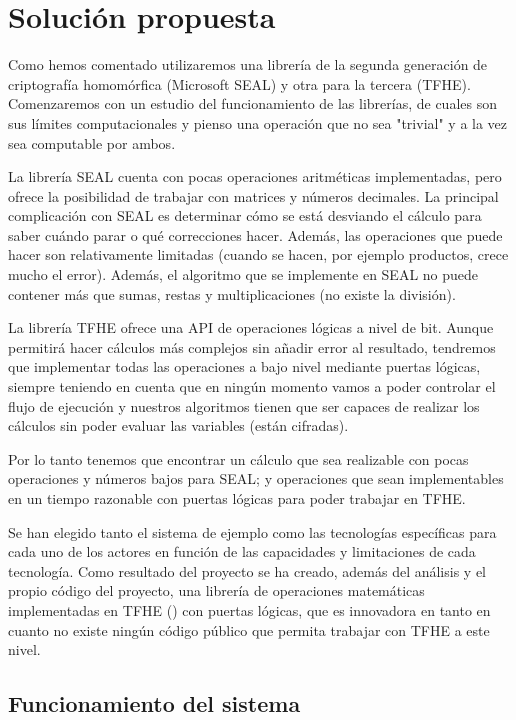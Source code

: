 \chapter{Solución propuesta}
\label{chap:poc}

Como hemos comentado utilizaremos una librería de la segunda generación de criptografía homomórfica (Microsoft SEAL) y otra para la tercera (TFHE). Comenzaremos con un estudio del funcionamiento de las librerías, de cuales son sus límites computacionales y pienso una operación que no sea "trivial" y a la vez sea computable por ambos.

La librería SEAL cuenta con pocas operaciones aritméticas implementadas, pero ofrece la posibilidad de trabajar con matrices y números decimales. La principal complicación con SEAL es determinar cómo se está desviando el cálculo para saber cuándo parar o qué correcciones hacer. Además, las operaciones que puede hacer son relativamente limitadas (cuando se hacen, por ejemplo productos, crece mucho el error). Además, el algoritmo que se implemente en SEAL no puede contener más que sumas, restas y multiplicaciones (no existe la división).

La librería TFHE ofrece una API de operaciones lógicas a nivel de bit. Aunque permitirá hacer cálculos más complejos sin añadir error al resultado, tendremos que implementar todas las operaciones a bajo nivel mediante puertas lógicas, siempre teniendo en cuenta que en ningún momento vamos a poder controlar el flujo de ejecución y nuestros algoritmos tienen que ser capaces de realizar los cálculos sin poder evaluar las variables (están cifradas).

Por lo tanto tenemos que encontrar un cálculo que sea realizable con pocas operaciones y números bajos para SEAL; y operaciones que sean implementables en un tiempo razonable con puertas lógicas para poder trabajar en TFHE.

Se han elegido tanto el sistema de ejemplo como las tecnologías específicas para cada uno de los actores en función de las capacidades y limitaciones de cada tecnología. Como resultado del proyecto se ha creado, además del análisis y el propio código del proyecto, una librería de operaciones matemáticas implementadas en TFHE (\cite{junquera_tfhe_2019}) con puertas lógicas, que es innovadora en tanto en cuanto no existe ningún código público que permita trabajar con TFHE a este nivel.

\section{Funcionamiento del sistema}

